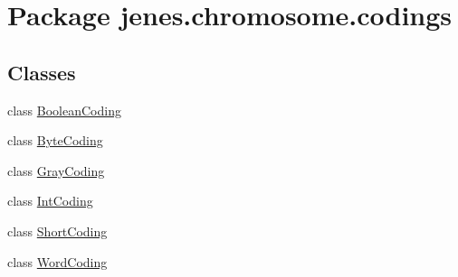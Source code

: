 \hypertarget{namespacejenes_1_1chromosome_1_1codings}{\section{Package jenes.\-chromosome.\-codings}
\label{namespacejenes_1_1chromosome_1_1codings}
}
\subsection*{Classes}
\begin{DoxyCompactItemize}
\item 
class \hyperlink{classjenes_1_1chromosome_1_1codings_1_1_boolean_coding}{Boolean\-Coding}
\item 
class \hyperlink{classjenes_1_1chromosome_1_1codings_1_1_byte_coding}{Byte\-Coding}
\item 
class \hyperlink{classjenes_1_1chromosome_1_1codings_1_1_gray_coding}{Gray\-Coding}
\item 
class \hyperlink{classjenes_1_1chromosome_1_1codings_1_1_int_coding}{Int\-Coding}
\item 
class \hyperlink{classjenes_1_1chromosome_1_1codings_1_1_short_coding}{Short\-Coding}
\item 
class \hyperlink{classjenes_1_1chromosome_1_1codings_1_1_word_coding}{Word\-Coding}
\end{DoxyCompactItemize}
